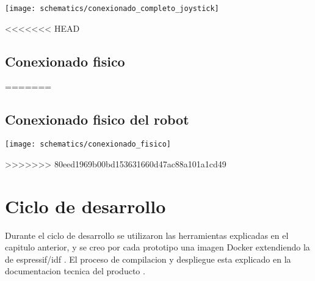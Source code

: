 \begin{center}
  \texttt{[image: schematics/conexionado\_completo\_joystick]}
    \label{fig:conexionado_completo_joystick}
\end{center}


<<<<<<< HEAD
\subsection{Conexionado fisico }
=======



\subsection{Conexionado fisico del robot}

\begin{center}
  \texttt{[image: schematics/conexionado\_fisico]}
    \label{fig:conexionado_fisico}
\end{center}
>>>>>>> 80eed1969b00bd153631660d47ac88a101a1cd49


\section{Ciclo de desarrollo}

Durante el ciclo de desarrollo se utilizaron las herramientas explicadas en el capitulo anterior, y se creo por cada prototipo una imagen Docker extendiendo la de espressif/idf \cite{Espressif_docker_image}. El proceso de compilacion y despliegue esta explicado en la documentacion tecnica del producto \cite{Robot_Tecnical_doc}.


